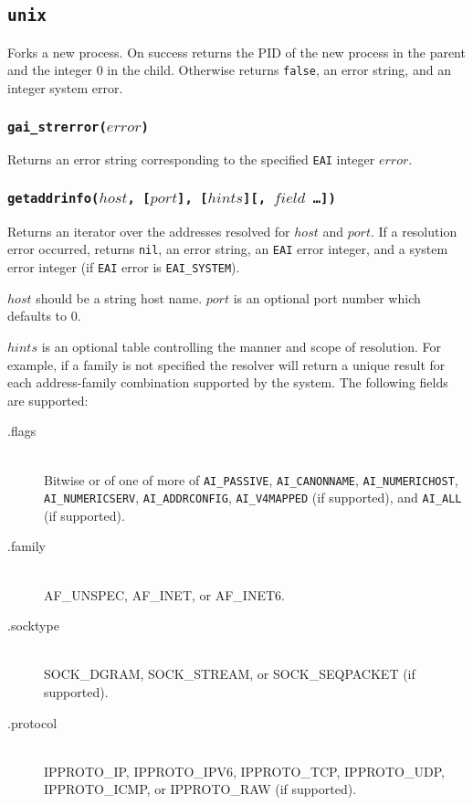 \documentclass[11pt, oneside]{memoir}
\newcommand*{\false}[0]{\texttt{false}\xspace}
\newcommand*{\nil}[0]{\texttt{nil}\xspace}
\newcommand*{\fn}[1]{\texttt{#1}\xspace}
\newcounter{toccols}
\newenvironment{Module}[1]{
	\subsection{\texttt{#1}}
	\addtocontents{toc}{
		\protect\begin{multicols}{\value{toccols}}
	}
}{
	\addtocontents{toc}{\protect\end{multicols}}
}
\begin{document}
\begin{Module}{unix}
Forks a new process. On success returns the PID of the new process in the parent and the integer 0 in the child. Otherwise returns \false, an error string, and an integer system error.

\subsubsection[\fn{gai\_strerror}]{\fn{gai\_strerror($error$)}}

Returns an error string corresponding to the specified \texttt{EAI} integer $error$.

\subsubsection[\fn{getaddrinfo}]{\fn{getaddrinfo($host$, [$port$], [$hints$][, $field$ \ldots])}}

Returns an iterator over the addresses resolved for $host$ and $port$. If a resolution error occurred, returns \nil, an error string, an \texttt{EAI} error integer, and a system error integer (if \texttt{EAI} error is \texttt{EAI\_SYSTEM}).

$host$ should be a string host name. $port$ is an optional port number which defaults to 0.

$hints$ is an optional table controlling the manner and scope of resolution. For example, if a family is not specified the resolver will return a unique result for each address-family combination supported by the system. The following fields are supported:

\begin{description}
\item[.flags] \hfill \\
Bitwise or of one of more of \texttt{AI\_PASSIVE}, \texttt{AI\_CANONNAME}, \texttt{AI\_NUMERICHOST}, \texttt{AI\_NUMERICSERV}, \texttt{AI\_ADDRCONFIG}, \texttt{AI\_V4MAPPED} (if supported), and \texttt{AI\_ALL} (if supported).
\item[.family] \hfill \\
AF\_UNSPEC, AF\_INET, or AF\_INET6.
\item[.socktype] \hfill \\
SOCK\_DGRAM, SOCK\_STREAM, or SOCK\_SEQPACKET (if supported).
\item[.protocol] \hfill \\
IPPROTO\_IP, IPPROTO\_IPV6, IPPROTO\_TCP, IPPROTO\_UDP, IPPROTO\_ICMP, or IPPROTO\_RAW (if supported).
\end{description}


\end{Module}
\end{document}
